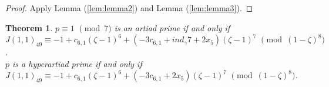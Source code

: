 \documentclass[a4paper,12pt]{article}
\newtheorem{theorem}{Theorem}[section]
\def\vpmod{\!\!\!\pmod}
\begin{document}
\begin{proof}
Apply Lemma (\ref{lem:lemma2}) and Lemma (\ref{lem:lemma3}). 
\end{proof}
\begin{theorem}\label{thm:theorem3}
 $p\equiv 1\,\,\vpmod 7$ is an artiad prime if and only if\\
$J(1,1)_{49} \equiv -1+c_{6,1}(\zeta -1)^6+(-3c_{6,1}+ind_{\gamma}7+2x_{5})(\zeta-1)^{7}\,\,\vpmod{(1-\zeta)^{8}}$.\\
 $p$ is a hyperartiad prime if and only if\\
$J(1,1)_{49} \equiv -1+c_{6,1}(\zeta -1)^6+(-3c_{6,1}+2x_{5})(\zeta-1)^7\,\,\vpmod{(1-\zeta)^{8}}$.
\end{theorem}
\end{document}
